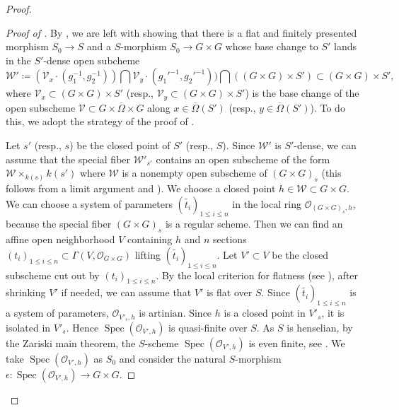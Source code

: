 \documentclass[11pt, reqno]{amsart}
\theoremstyle{plain}
\theoremstyle{definition}
\DeclareMathOperator{\Spec}{Spec}		%
\begin{document}
\begin{proof}
\begin{proof}[Proof of ]
    By , we are left with showing that there is a flat and finitely presented morphism $S_0\longrightarrow S$ and a $S$-morphism $S_0 \longrightarrow G\times G$ whose base change to $S'$ lands in the $S'$-dense open subcheme 
$$\mathcal{W}'\coloneq(\mathcal{V}_{x}\cdot(g_1^{-1}, g_2^{-1}))\bigcap \mathcal{V}_{y}\cdot(g_1'^{-1}, g_2'^{-1}))\bigcap (( G\times G)\times S')\subset (G\times G)\times S',$$
where $\mathcal{V}_{x}\subset ( G\times G)\times S'$ (resp., $\mathcal{V}_{y}\subset ( G\times G)\times S'$) is the base change of the open subscheme $\mathcal{V}\subset G\times\overline{\Omega}\times G$ along $x\in\overline{\Omega}(S')$ (resp., $y\in\overline{\Omega}(S')$). To do this, we adopt the strategy of the proof of \cite[corollaire~17.16.2]{EGAIV4}.

Let $s'$ (resp., $s$) be the closed point of $S'$ (resp., $S$). Since $\mathcal{W}'$ is $S'$-dense, we can assume that the special fiber $\mathcal{W}'_{s'}$ contains an open subscheme of the form $\mathcal{W}\times_{k(s)}k(s')$ where $\mathcal{W}$ is a nonempty open subscheme of $(G\times G)_s$ (this follows from a limit argument and \cite[01JR, 01UA]{stacks-project}). We choose a closed point $h\in \mathcal{W}\subset G\times G$. We can choose a system of parameters $(\widetilde{t_i})_{1\leq i\leq n}$ in the local ring $\mathcal{O}_{(G\times G)_s,h}$, because the special fiber $(G\times G)_s$ is a regular scheme. Then we can find an affine open neighborhood $V$ containing $h$ and $n$ sections $(t_i)_{1\leq i\leq n}\subset \Gamma (V,\mathcal{O}_{G\times G})$ lifting $(\widetilde{t_i})_{1\leq i\leq n}$. Let $V'\subset V$ be the closed subscheme cut out by $(t_i)_{1\leq i\leq n}$. By the local criterion for flatness (see \cite[théorème~11.3.8 b') and c)]{EGAIV3}), after shrinking $V'$ if needed, we can assume that $V'$ is flat over $S$. Since $(\widetilde{t_i})_{1\leq i\leq n}$ is a system of parameters,  $\mathcal{O}_{V'_s, h}$ is artinian. Since $h$ is a closed point in $V'_s$, it is isolated in $V'_s$. Hence $\Spec(\mathcal{O}_{V',h})$ is quasi-finite over $S$. As $S$ is henselian, by the Zariski main theorem, the $S$-scheme $\Spec(\mathcal{O}_{V',h})$ is even finite, see \cite[théorème~18.5.11 c')]{EGAIV4}. We take $\Spec(\mathcal{O}_{V',h})$ as $S_0$ and consider the natural $S$-morphism $\epsilon\colon\Spec(\mathcal{O}_{V',h})\rightarrow G\times G$.


\end{proof}
\end{proof}
\end{document}
